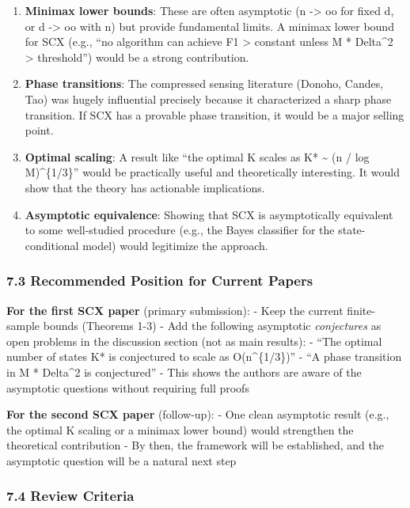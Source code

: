 \documentclass[
  12pt,
]{article}
\begin{document}
\begin{enumerate}
\def\labelenumi{\arabic{enumi}.}
\item
  \textbf{Minimax lower bounds}: These are often asymptotic (n
  -\textgreater{} oo for fixed d, or d -\textgreater{} oo with n) but
  provide fundamental limits. A minimax lower bound for SCX (e.g., ``no
  algorithm can achieve F1 \textgreater{} constant unless M * Delta\^{}2
  \textgreater{} threshold'') would be a strong contribution.
\item
  \textbf{Phase transitions}: The compressed sensing literature (Donoho,
  Candes, Tao) was hugely influential precisely because it characterized
  a sharp phase transition. If SCX has a provable phase transition, it
  would be a major selling point.
\item
  \textbf{Optimal scaling}: A result like ``the optimal K scales as K*
  \textasciitilde{} (n / log M)\^{}\{1/3\}'' would be practically useful
  and theoretically interesting. It would show that the theory has
  actionable implications.
\item
  \textbf{Asymptotic equivalence}: Showing that SCX is asymptotically
  equivalent to some well-studied procedure (e.g., the Bayes classifier
  for the state-conditional model) would legitimize the approach.
\end{enumerate}

\subsubsection{7.3 Recommended Position for Current
Papers}\label{recommended-position-for-current-papers}

\textbf{For the first SCX paper} (primary submission): - Keep the
current finite-sample bounds (Theorems 1-3) - Add the following
asymptotic \emph{conjectures} as open problems in the discussion section
(not as main results): - ``The optimal number of states K* is
conjectured to scale as O(n\^{}\{1/3\})'' - ``A phase transition in M *
Delta\^{}2 is conjectured'' - This shows the authors are aware of the
asymptotic questions without requiring full proofs

\textbf{For the second SCX paper} (follow-up): - One clean asymptotic
result (e.g., the optimal K scaling or a minimax lower bound) would
strengthen the theoretical contribution - By then, the framework will be
established, and the asymptotic question will be a natural next step

\subsubsection{7.4 Review Criteria}\label{review-criteria}
\end{document}
